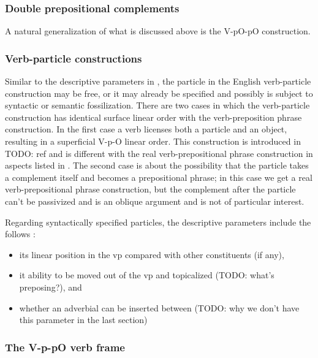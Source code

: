 \documentclass[UTF8, a4paper, oneside, scheme=plain, 12pt]{ctexbook}
\newcommand*{\citesec}[1]{\S~{#1}}
\newcommand*{\citechap}[1]{Ch.~{#1}}
\begin{document}
\subsubsection{Double prepositional complements}

A natural generalization of what is discussed above is 
the V-pO-pO construction.

\subsubsection{Verb-particle constructions}\label{sec:vp.valence.verb-particle}

Similar to the descriptive parameters in ,
the particle in the English verb-particle construction
may be free, 
or it may already be specified 
and possibly is subject to syntactic or semantic fossilization. 
There are two cases in which the verb-particle construction 
has identical surface linear order 
with the verb-preposition phrase construction.
In the first case a verb licenses both a particle and an object,
resulting in a superficial V-p-O linear order. 
This construction is introduced in TODO: ref
and is different with the real verb-prepositional phrase construction
in aspects listed in \citet[\citechap{4}, \citesec{6.2}]{cgel}.
The second case is about the possibility that the particle takes a complement itself 
and becomes a prepositional phrase;
in this case we get a real verb-prepositional phrase construction,
but the complement after the particle can't be passivized
and is an oblique argument and is not of particular interest.

Regarding syntactically specified particles, 
the descriptive parameters include the follows \citep[\citechap{4}, \citesec{6.3}]{cgel}:
\begin{itemize}
    \item its linear position in the \acs{vp} compared with other constituents (if any),
    \item it ability to be moved out of the \acs{vp}
        and topicalized (TODO: what's preposing?), and 
    \item whether an adverbial can be inserted between  (TODO: why we don't have this parameter in the last section) 
\end{itemize}

\subsubsection{The V-p-pO verb frame}
\end{document}
